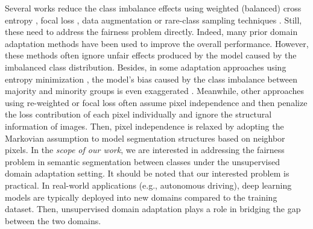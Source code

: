 \documentclass[10pt,twocolumn,letterpaper]{article}
\begin{document}
Several works reduce the class imbalance effects using weighted (balanced) cross entropy \cite{Cui_2019_CVPR, wang2021seesaw, DBLP:conf/aaai/Ting21}, focal loss \cite{Araslanov:2021:DASAC}, data augmentation or rare-class sampling techniques \cite{Araslanov:2021:DASAC, daformer}. Still, these need to address the fairness problem directly. Indeed, many prior domain adaptation methods  \cite{hoffman2016fcns, tsai2018learning, tsai2019domain, chen2019domain, 9956335, 9108692, 9897440, truong2022conda} have been used to improve the overall performance. However, these methods often ignore unfair effects produced by the model caused by the imbalanced class distribution. Besides, in some adaptation approaches using entropy minimization \cite{vu2019advent, pan2020unsupervised}, the model's bias caused by the class imbalance between majority and minority groups is even exaggerated \cite{truong2021bimal, Chen_2019_ICCV}.
Meanwhile, other approaches using re-weighted or focal loss \cite{Araslanov:2021:DASAC} often assume pixel independence and then penalize the loss contribution of each pixel individually and ignore the structural information of images. Then, pixel independence is relaxed by adopting the Markovian assumption \cite{Zheng_2015_ICCV, chen2018deeplab} to model segmentation structures based on neighbor pixels. 
In the \textit{scope of our work}, we are interested in addressing the fairness problem in semantic segmentation between classes under the unsupervised domain adaptation setting. It should be noted that our interested problem is practical. In real-world applications (e.g., autonomous driving), deep learning models are typically deployed into new domains compared to the training dataset. Then, unsupervised domain adaptation plays a role in bridging the gap between the two domains.
\end{document}
